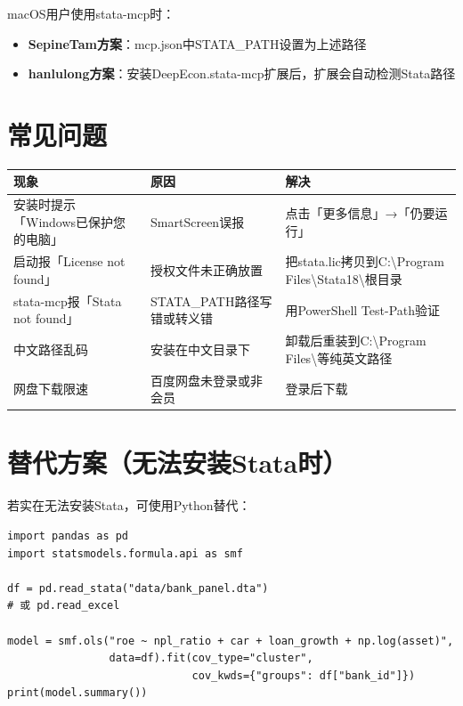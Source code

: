 macOS用户使用stata-mcp时：
\begin{itemize}[leftmargin=2em]
  \item \textbf{SepineTam方案}：mcp.json中STATA\_PATH设置为上述路径
  \item \textbf{hanlulong方案}：安装DeepEcon.stata-mcp扩展后，扩展会自动检测Stata路径
\end{itemize}

\section{常见问题}

\begin{table}[H]
\centering
\begin{tabular}{lp{3.5cm}p{5.5cm}}
\toprule
\textbf{现象} & \textbf{原因} & \textbf{解决} \\
\midrule
安装时提示「Windows已保护您的电脑」 & SmartScreen误报 & 点击「更多信息」→「仍要运行」 \\
启动报「License not found」 & 授权文件未正确放置 & 把stata.lic拷贝到C:\textbackslash Program Files\textbackslash Stata18\textbackslash{}根目录 \\
stata-mcp报「Stata not found」 & STATA\_PATH路径写错或转义错 & 用PowerShell Test-Path验证 \\
中文路径乱码 & 安装在中文目录下 & 卸载后重装到C:\textbackslash Program Files\textbackslash{}等纯英文路径 \\
网盘下载限速 & 百度网盘未登录或非会员 & 登录后下载 \\
\bottomrule
\end{tabular}
\end{table}

\section{替代方案（无法安装Stata时）}

若实在无法安装Stata，可使用Python替代：

\begin{lstlisting}[style=python]
import pandas as pd
import statsmodels.formula.api as smf

df = pd.read_stata("data/bank_panel.dta")
# 或 pd.read_excel

model = smf.ols("roe ~ npl_ratio + car + loan_growth + np.log(asset)",
                data=df).fit(cov_type="cluster",
                             cov_kwds={"groups": df["bank_id"]})
print(model.summary())
\end{lstlisting}

